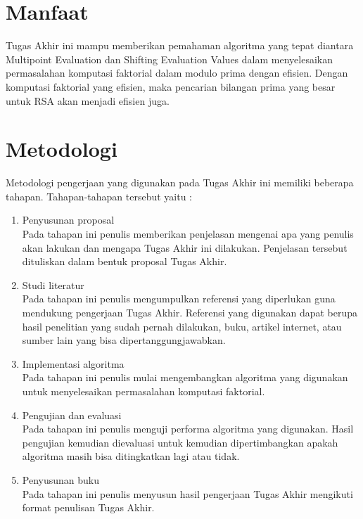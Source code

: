\section {Manfaat}
Tugas Akhir ini mampu memberikan pemahaman algoritma yang tepat diantara Multipoint Evaluation dan Shifting Evaluation Values dalam menyelesaikan permasalahan komputasi faktorial dalam modulo prima dengan efisien. Dengan komputasi faktorial yang efisien, maka pencarian bilangan prima yang besar untuk RSA akan menjadi efisien juga.

\section {Metodologi}
Metodologi pengerjaan yang digunakan pada Tugas Akhir ini memiliki beberapa tahapan. Tahapan-tahapan tersebut yaitu :

\begin{enumerate}
    \item Penyusunan proposal\\
    Pada tahapan ini penulis memberikan penjelasan mengenai apa yang penulis akan lakukan dan mengapa Tugas Akhir ini dilakukan. Penjelasan tersebut dituliskan dalam bentuk proposal Tugas Akhir.
    \item Studi literatur\\
    Pada tahapan ini penulis mengumpulkan referensi yang diperlukan guna mendukung pengerjaan Tugas Akhir. Referensi yang digunakan dapat berupa hasil penelitian yang sudah pernah dilakukan, buku, artikel internet, atau sumber lain yang bisa dipertanggungjawabkan.
    \item Implementasi algoritma\\
    Pada tahapan ini penulis mulai mengembangkan algoritma yang digunakan untuk menyelesaikan permasalahan komputasi faktorial.
    \item Pengujian dan evaluasi\\
    Pada tahapan ini penulis menguji performa algoritma yang digunakan. Hasil pengujian kemudian dievaluasi untuk kemudian dipertimbangkan apakah algoritma masih bisa ditingkatkan lagi atau tidak.
    \item Penyusunan buku\\
    Pada tahapan ini penulis menyusun hasil pengerjaan Tugas Akhir mengikuti format penulisan Tugas Akhir.
\end{enumerate}

